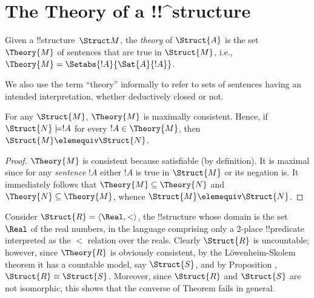 \documentclass[../../include/open-logic-section]{subfiles}
\begin{document}
\section{The Theory of a !!^{structure}}

\begin{defn} 
  Given a !!{structure}~$\Struct M$, the \emph{theory} of
  $\Struct{A}$ is the set $\Theory{M}$ of sentences
  that are true in $\Struct{M}$, i.e., $\Theory{M} =
  \Setabs{!A}{\Sat{A}{!A}}$.
\end{defn}

We also use the term ``theory'' informally to refer to sets
of sentences having an intended interpretation, whether deductively
closed or not.

\begin{prop}
  For any $\Struct{M}$,  $\Theory{M}$ is maximally
  consistent. Hence, if $\Struct{N} \models !A$ for every $!A
  \in \Theory{M}$, then $\Struct{M} \elemequiv
  \Struct{N}$. 
\end{prop}

\begin{proof}
  $\Theory{M}$ is consistent because satisfiable (by definition). It
  is maximal since for any \emph{sentence} $!A$ either $!A$ is true in
  $\Struct{M}$ or its negation is. It immediately follows that
  $\Theory{M} \subseteq \Theory{N}$ and $\Theory{N} \subseteq
  \Theory{M}$, whence $\Struct{M} \elemequiv \Struct{N}$.
\end{proof}

\begin{rem}
  Consider $\Struct{R} = \langle\Real, <\rangle$, the !!{structure}
  whose domain is the set $\Real$ of the real numbers, in the language
  comprising only a 2-place !!{predicate} interpreted as the $<$ relation
  over the reals. Clearly $\Struct{R}$ is uncountable; however, since
  $\Theory{R}$ is obviously consistent, by the L\"owenheim-Skolem
  theorem it has a countable model, say $\Struct{S}$, and by
  Proposition , $\Struct{R} \equiv
  \Struct{S}$. Moreover, since $\Struct{R}$ and $\Struct{S}$ are not
  isomorphic, this shows that the converse of Theorem 
  fails in general.
\end{rem}
\end{document}
